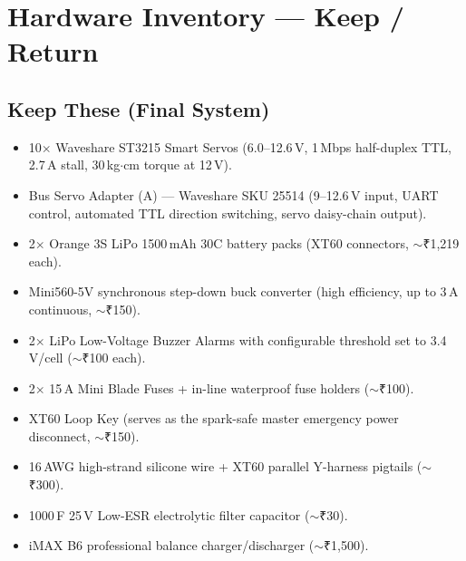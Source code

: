 \documentclass[11pt,a4paper]{article}
\begin{document}
\tableofcontents
\vspace{1.5em}
\newpage

\section{Hardware Inventory --- Keep / Return}

\subsection{Keep These (Final System)}
\begin{description}[leftmargin=1.8em, itemsep=0.4em]
    \item[\textbf{Core Motors \& Driver:}]
    \begin{itemize}[leftmargin=1.2em, itemsep=0.15em]
        \item 10$\times$ Waveshare ST3215 Smart Servos (6.0--12.6\,V, 1\,Mbps half-duplex TTL, 2.7\,A stall, 30\,kg$\cdot$cm torque at 12\,V).
        \item Bus Servo Adapter (A) --- Waveshare SKU 25514 (9--12.6\,V input, UART control, automated TTL direction switching, servo daisy-chain output).
    \end{itemize}

    \item[\textbf{Power Supply \& Distribution:}]
    \begin{itemize}[leftmargin=1.2em, itemsep=0.15em]
        \item 2$\times$ Orange 3S LiPo 1500\,mAh 30C battery packs (XT60 connectors, $\sim$₹1,219 each).
        \item Mini560-5V synchronous step-down buck converter (high efficiency, up to 3\,A continuous, $\sim$₹150).
        \item 2$\times$ LiPo Low-Voltage Buzzer Alarms with configurable threshold set to 3.4\,V/cell ($\sim$₹100 each).
        \item 2$\times$ 15\,A Mini Blade Fuses + in-line waterproof fuse holders ($\sim$₹100).
        \item XT60 Loop Key (serves as the spark-safe master emergency power disconnect, $\sim$₹150).
        \item 16\,AWG high-strand silicone wire + XT60 parallel Y-harness pigtails ($\sim$₹300).
        \item 1000\,\textmu F 25\,V Low-ESR electrolytic filter capacitor ($\sim$₹30).
        \item iMAX B6 professional balance charger/discharger ($\sim$₹1,500).
    \end{itemize}


\end{description}
\end{document}
